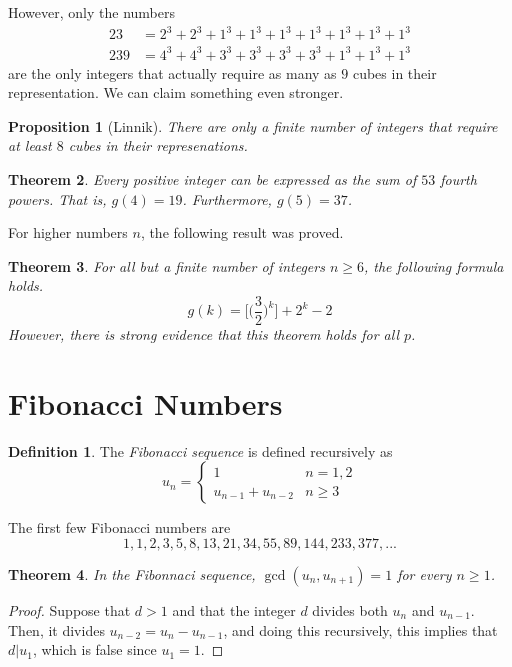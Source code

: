\documentclass{article}
\newtheorem{theorem}{Theorem}[section]
\newtheorem{proposition}[theorem]{Proposition}
\theoremstyle{remark}
\theoremstyle{definition}
\newtheorem{definition}{Definition}[section]
\begin{document}
However, only the numbers
\begin{align*}
    23 & = 2^3 + 2^3 + 1^3 + 1^3 + 1^3 + 1^3 + 1^3 + 1^3 + 1^3 \\
    239 & = 4^3 + 4^3 + 3^3+ 3^3 + 3^3 + 3^3 + 1^3 + 1^3 + 1^3 
\end{align*}
are the only integers that actually require as many as $9$ cubes in their representation. We can claim something even stronger.

\begin{proposition}[Linnik]
There are only a finite number of integers that require at least $8$ cubes in their represenations. 
\end{proposition}

\begin{theorem}
Every positive integer can be expressed as the sum of $53$ fourth powers. That is, $g(4) = 19$. Furthermore, $g(5) = 37$.  
\end{theorem}

For higher numbers $n$, the following result was proved. 

\begin{theorem}
For all but a finite number of integers $n \geq 6$, the following formula holds. 
\[g(k) = \bigg[ \bigg( \frac{3}{2} \bigg)^k \bigg] + 2^k - 2\]
However, there is strong evidence that this theorem holds for all $p$. 
\end{theorem}

\section{Fibonacci Numbers}

\begin{definition}
The \textit{Fibonacci sequence} is defined recursively as 
\[u_n = \begin{cases}
1 & n = 1, 2 \\
u_{n-1} + u_{n-2} & n \geq 3
\end{cases}\]
\end{definition}

The first few Fibonacci numbers are
\[1, 1, 2, 3, 5, 8, 13, 21, 34, 55, 89, 144, 233, 377, ...\]

\begin{theorem}
In the Fibonnaci sequence, $\gcd(u_n, u_{n+1}) = 1$ for every $n\geq 1$. 
\end{theorem}
\begin{proof}
Suppose that $d >1 $ and that the integer $d$ divides both $u_n$ and $u_{n-1}$. Then, it divides $u_{n-2} = u_n - u_{n-1}$, and doing this recursively, this implies that $d | u_1$, which is false since $u_1 = 1$.
\end{proof}
\end{document}
